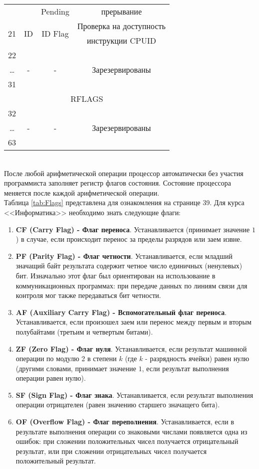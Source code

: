 \begin{table}[h]
\begin{tabular}{|c|c|c|c|}
\\ & & Pending & прерывание
\\ \multirow{2}{*}{21} & \multirow{2}{*}{ID} & \multirow{2}{*}{ID Flag} & Проверка на доступность
\\ & & & инструкции CPUID
\\ 22 & \multirow{3}{*}{-} & \multirow{3}{*}{-} & \multirow{3}{*}{Зарезервированы}
\\ \dots & & &
\\ 31 & & &
\\\hline
\multicolumn{4}{|c|}{RFLAGS} \\
\hline
32 & \multirow{3}{*}{-} & \multirow{3}{*}{-} & \multirow{3}{*}{Зарезервированы}
\\ \dots & & &
\\ 63 & & & \\
\hline
\end{tabular}
\end{table}
\\После любой арифметической операции процессор автоматически без участия программиста заполняет регистр флагов состояния. Состояние процессора меняется после каждой арифметической операции.
\\Таблица \ref{tab:Flags} представлена для ознакомления на странице 39. Для курса <<Информатика>> необходимо знать следующие флаги:
\begin{enumerate}
  \item \textbf{CF (Carry Flag) - Флаг переноса}. Устанавливается (принимает значение $1$) в случае, если происходит перенос за пределы разрядов или заем извне.
  \item \textbf{PF (Parity Flag) - Флаг четности}. Устанавливается, если младший значащий байт результата содержит четное число единичных (ненулевых) бит. Изначально этот флаг был ориентирован на использование в коммуникационных программах: при передаче данных по линиям связи для контроля мог также передаваться бит четности.
  \item \textbf{AF (Auxiliary Carry Flag) - Вспомогательный флаг переноса}. Устанавливается, если произошел заем или перенос между первым и вторым полубайтами (третьим и четвертым битами).
  \item \textbf{ZF (Zero Flag) - Флаг нуля}. Устанавливается, если результат машинной операции по модулю 2 в степени $k$ (где $k$ - разрядность ячейки) равен нулю (другими словами, принимает значение $1$, если результат выполнения операции равен нулю).
  \item \textbf{SF (Sign Flag) - Флаг знака}. Устанавливается, если результат выполнения операции отрицателен (равен значению старшего значащего бита).
  \item \textbf{OF (Overflow Flag) - Флаг переполнения}. Устанавливается, если в результате выполнения операции со знаковыми числами появляется одна из ошибок: при сложении положительных чисел получается отрицательный результат, или при сложении отрицательных чисел получается положительный результат.
\end{enumerate}

